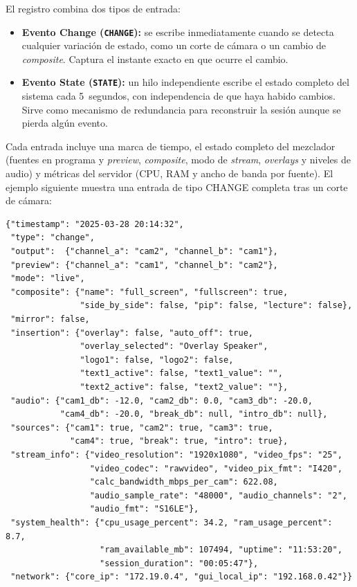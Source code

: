 El registro combina dos tipos de entrada:

\begin{itemize}
  \item \textbf{Evento Change (\texttt{CHANGE}):} se escribe inmediatamente cuando se
        detecta cualquier variación de estado, como un corte de cámara o un cambio de
        \textit{composite}. Captura el instante exacto en que ocurre el cambio.
  \item \textbf{Evento State (\texttt{STATE}):} un hilo independiente escribe el estado
        completo del sistema cada 5~segundos, con independencia de que haya habido
        cambios. Sirve como mecanismo de redundancia para reconstruir la sesión aunque
        se pierda algún evento.
\end{itemize}

Cada entrada incluye una marca de tiempo, el estado completo del mezclador (fuentes en
programa y \textit{preview}, \textit{composite}, modo de \textit{stream}, \textit{overlays} y niveles de audio) y métricas
del servidor (\ac{CPU}, \ac{RAM} y ancho de banda por fuente). El ejemplo siguiente muestra una
entrada de tipo CHANGE completa tras un corte de cámara:

\begin{verbatim}
{"timestamp": "2025-03-28 20:14:32",
 "type": "change",
 "output":  {"channel_a": "cam2", "channel_b": "cam1"},
 "preview": {"channel_a": "cam1", "channel_b": "cam2"},
 "mode": "live",
 "composite": {"name": "full_screen", "fullscreen": true,
               "side_by_side": false, "pip": false, "lecture": false},
 "mirror": false,
 "insertion": {"overlay": false, "auto_off": true,
               "overlay_selected": "Overlay Speaker",
               "logo1": false, "logo2": false,
               "text1_active": false, "text1_value": "",
               "text2_active": false, "text2_value": ""},
 "audio": {"cam1_db": -12.0, "cam2_db": 0.0, "cam3_db": -20.0,
           "cam4_db": -20.0, "break_db": null, "intro_db": null},
 "sources": {"cam1": true, "cam2": true, "cam3": true,
             "cam4": true, "break": true, "intro": true},
 "stream_info": {"video_resolution": "1920x1080", "video_fps": "25",
                 "video_codec": "rawvideo", "video_pix_fmt": "I420",
                 "calc_bandwidth_mbps_per_cam": 622.08,
                 "audio_sample_rate": "48000", "audio_channels": "2",
                 "audio_fmt": "S16LE"},
 "system_health": {"cpu_usage_percent": 34.2, "ram_usage_percent": 8.7,
                   "ram_available_mb": 107494, "uptime": "11:53:20",
                   "session_duration": "00:05:47"},
 "network": {"core_ip": "172.19.0.4", "gui_local_ip": "192.168.0.42"}}
\end{verbatim}

